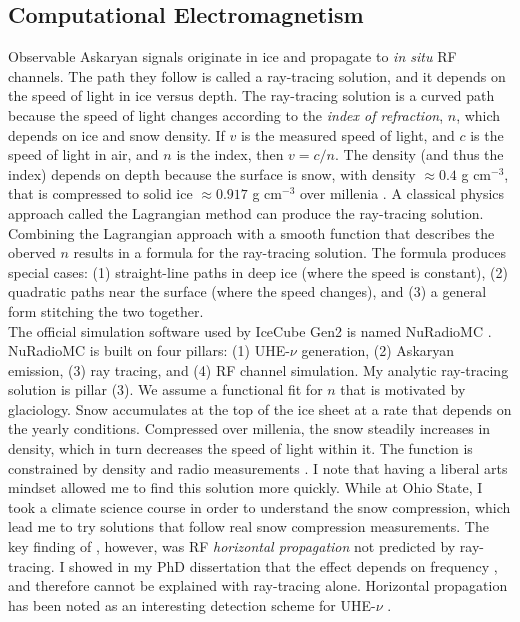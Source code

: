 \documentclass[../../../main.tex]{subfiles}
\begin{document}
\subsection{Computational Electromagnetism}
\label{sec:cem}

Observable Askaryan signals originate in ice and propagate to \textit{in situ} RF channels.  The path they follow is called a ray-tracing solution, and it depends on the speed of light in ice versus depth.  The ray-tracing solution is a curved path because the speed of light changes according to the \textit{index of refraction}, $n$, which depends on ice and snow density.  If $v$ is the measured speed of light, and $c$ is the speed of light in air, and $n$ is the index, then $v = c/n$.  The density (and thus the index) depends on depth because the surface is snow, with density $\approx 0.4$ g cm$^{-3}$, that is compressed to solid ice $\approx 0.917$ g cm$^{-3}$ over millenia \cite{10.3189/2015jog14j214}.  A classical physics approach called the Lagrangian method can produce the ray-tracing solution. Combining the Lagrangian approach with a smooth function that describes the oberved $n$ results in a formula for the ray-tracing solution.  The formula produces special cases: (1) straight-line paths in deep ice (where the speed is constant), (2) quadratic paths near the surface (where the speed changes), and (3) a general form stitching the two together.
\\
\vspace{0.25cm}
The official simulation software used by IceCube Gen2 is named NuRadioMC \cite{10.1140/epjc/s10052-020-7612-8}.  NuRadioMC is built on four pillars: (1) UHE-$\nu$ generation, (2) Askaryan emission, (3) ray tracing, and (4) RF channel simulation.  My analytic ray-tracing solution is pillar (3).  We assume a functional fit for $n$ that is motivated by glaciology.  Snow accumulates at the top of the ice sheet at a rate that depends on the yearly conditions.  Compressed over millenia, the snow steadily increases in density, which in turn decreases the speed of light within it.  The function is constrained by density and radio measurements \cite{Barwick:2018497}.  I note that having a liberal arts mindset allowed me to find this solution more quickly.  While at Ohio State, I took a climate science course in order to understand the snow compression, which lead me to try solutions that follow real snow compression measurements.  The key finding of \cite{Barwick:2018497}, however, was RF \textit{horizontal propagation} not predicted by ray-tracing.  I showed in my PhD dissertation that the effect depends on frequency \cite{hanson}, and therefore cannot be explained with ray-tracing alone.  Horizontal propagation has been noted as an interesting detection scheme for UHE-$\nu$ \cite{10.1103/physrevd.71.011503}.
\end{document}
